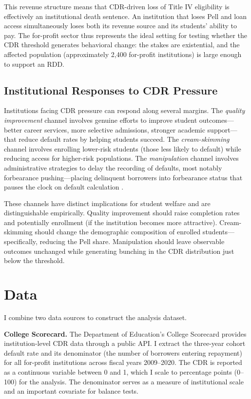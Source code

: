 \documentclass[12pt]{article}
\begin{document}
This revenue structure means that CDR-driven loss of Title IV eligibility is effectively an institutional death sentence. An institution that loses Pell and loan access simultaneously loses both its revenue source and its students' ability to pay. The for-profit sector thus represents the ideal setting for testing whether the CDR threshold generates behavioral change: the stakes are existential, and the affected population (approximately 2,400 for-profit institutions) is large enough to support an RDD.

\subsection{Institutional Responses to CDR Pressure}

Institutions facing CDR pressure can respond along several margins. The \textit{quality improvement} channel involves genuine efforts to improve student outcomes---better career services, more selective admissions, stronger academic support---that reduce default rates by helping students succeed. The \textit{cream-skimming} channel involves enrolling lower-risk students (those less likely to default) while reducing access for higher-risk populations. The \textit{manipulation} channel involves administrative strategies to delay the recording of defaults, most notably forbearance pushing---placing delinquent borrowers into forbearance status that pauses the clock on default calculation \citep{itzkowitz2018}.

These channels have distinct implications for student welfare and are distinguishable empirically. Quality improvement should raise completion rates and potentially enrollment (if the institution becomes more attractive). Cream-skimming should change the demographic composition of enrolled students---specifically, reducing the Pell share. Manipulation should leave observable outcomes unchanged while generating bunching in the CDR distribution just below the threshold.


\section{Data}

I combine two data sources to construct the analysis dataset.

\textbf{College Scorecard.} The Department of Education's College Scorecard provides institution-level CDR data through a public API. I extract the three-year cohort default rate and its denominator (the number of borrowers entering repayment) for all for-profit institutions across fiscal years 2009--2020. The CDR is reported as a continuous variable between 0 and 1, which I scale to percentage points (0--100) for the analysis. The denominator serves as a measure of institutional scale and an important covariate for balance tests.
\end{document}
